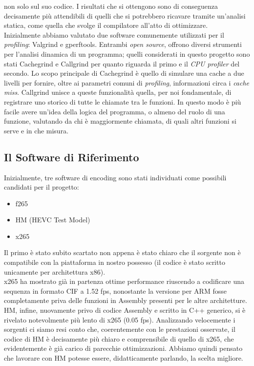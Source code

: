 non solo sul suo codice. I risultati che si ottengono sono di conseguenza 
decisamente più 
attendibili di quelli che si potrebbero ricavare tramite 
un'analisi statica, come quella che svolge il compilatore all'atto di 
ottimizzare.\\
Inizialmente abbiamo valutato due software comunemente utilizzati per 
il \emph{profiling}: Valgrind e gperftools.
Entrambi \emph{open source}, offrono diversi strumenti per l'analisi dinamica 
di un programma; quelli considerati in questo progetto sono stati Cachegrind e 
Callgrind per quanto riguarda il primo e il \emph{CPU profiler} del secondo. 
Lo scopo principale di Cachegrind è quello di simulare una cache a due livelli 
per fornire, oltre ai parametri comuni di \emph{profiling}, informazioni circa 
i \emph{cache miss}. Callgrind unisce a queste funzionalità quella, per noi 
fondamentale, di registrare uno storico di tutte le chiamate tra le funzioni. 
In questo modo è più facile avere un'idea della logica del programma, o almeno 
del ruolo di una funzione, valutando da chi è maggiormente chiamata, di quali 
altri funzioni si serve e in che misura.
\subsection{Il Software di Riferimento}
Inizialmente, tre software di encoding sono stati individuati come possibili
candidati per il progetto:
\begin{itemize}
	\item f265
	\item HM (HEVC Test Model)
	\item x265
\end{itemize}
Il primo è stato subito scartato non appena è stato chiaro che il sorgente non 
è compatibile con la piattaforma in nostro possesso (il codice è stato scritto 
unicamente per architettura x86).\\
x265 ha mostrato già in partenza ottime performance riuscendo a 
codificare una sequenza in formato CIF a 1.52 fps, nonostante la versione per 
ARM fosse completamente priva delle funzioni in Assembly presenti per le altre 
architetture.\\
HM, infine, nuovamente privo di codice Assembly e scritto in C++ generico, si è 
rivelato notevolmente più lento di x265 (0.05 fps). Analizzando velocemente i 
sorgenti 
ci siamo resi conto che, coerentemente con le prestazioni osservate, il codice 
di HM è decisamente più chiaro e comprensibile di quello di x265, che 
evidentemente è già carico di parecchie ottimizzazioni. Abbiamo quindi pensato 
che 
lavorare con HM potesse essere, didatticamente parlando, la scelta migliore.
